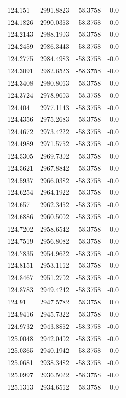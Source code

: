 \begin{table}[H]
\begin{tabular}{llll}
124.151 & 2991.8823 & -58.3758 & -0.0 \\
124.1826 & 2990.0363 & -58.3758 & -0.0 \\
124.2143 & 2988.1903 & -58.3758 & -0.0 \\
124.2459 & 2986.3443 & -58.3758 & -0.0 \\
124.2775 & 2984.4983 & -58.3758 & -0.0 \\
124.3091 & 2982.6523 & -58.3758 & -0.0 \\
124.3408 & 2980.8063 & -58.3758 & -0.0 \\
124.3724 & 2978.9603 & -58.3758 & -0.0 \\
124.404 & 2977.1143 & -58.3758 & -0.0 \\
124.4356 & 2975.2683 & -58.3758 & -0.0 \\
124.4672 & 2973.4222 & -58.3758 & -0.0 \\
124.4989 & 2971.5762 & -58.3758 & -0.0 \\
124.5305 & 2969.7302 & -58.3758 & -0.0 \\
124.5621 & 2967.8842 & -58.3758 & -0.0 \\
124.5937 & 2966.0382 & -58.3758 & -0.0 \\
124.6254 & 2964.1922 & -58.3758 & -0.0 \\
124.657 & 2962.3462 & -58.3758 & -0.0 \\
124.6886 & 2960.5002 & -58.3758 & -0.0 \\
124.7202 & 2958.6542 & -58.3758 & -0.0 \\
124.7519 & 2956.8082 & -58.3758 & -0.0 \\
124.7835 & 2954.9622 & -58.3758 & -0.0 \\
124.8151 & 2953.1162 & -58.3758 & -0.0 \\
124.8467 & 2951.2702 & -58.3758 & -0.0 \\
124.8783 & 2949.4242 & -58.3758 & -0.0 \\
124.91 & 2947.5782 & -58.3758 & -0.0 \\
124.9416 & 2945.7322 & -58.3758 & -0.0 \\
124.9732 & 2943.8862 & -58.3758 & -0.0 \\
125.0048 & 2942.0402 & -58.3758 & -0.0 \\
125.0365 & 2940.1942 & -58.3758 & -0.0 \\
125.0681 & 2938.3482 & -58.3758 & -0.0 \\
125.0997 & 2936.5022 & -58.3758 & -0.0 \\
125.1313 & 2934.6562 & -58.3758 & -0.0 \\

\end{tabular}
\end{table}
